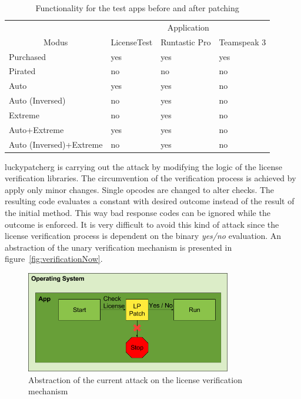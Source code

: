 \begin{table}
\centering
\begin{tabular}{llll}
                                             & \multicolumn{3}{c}{Application}             \\
\multicolumn{1}{c|}{Modus}                   & LicenseTest & Runtastic Pro & Teamspeak 3 \\ \hline
\multicolumn{1}{l|}{Purchased}               & yes           & yes           & yes         \\
\multicolumn{1}{l|}{Pirated}                 & no            & no            & no          \\
\multicolumn{1}{l|}{Auto}                    & yes           & yes           & no          \\
\multicolumn{1}{l|}{Auto (Inversed)}         & no            & yes           & no          \\
\multicolumn{1}{l|}{Extreme}                 & no            & yes           & no          \\
\multicolumn{1}{l|}{Auto+Extreme}            & yes           & yes           & no          \\
\multicolumn{1}{l|}{Auto (Inversed)+Extreme} & no            & yes           & no
\end{tabular}
\caption{Functionality for the test apps before and after patching}
\label{table:functionality}
\end{table}
\gls{luckypatcherg} is carrying out the attack by modifying the logic of the license verification libraries.
The circumvention of the verification process is achieved by apply only minor changes.
Single opcodes are changed to alter checks.
The resulting code evaluates a constant with desired outcome instead of the result of the initial method.
This way bad response codes can be ignored while the outcome is enforced.
It is very difficult to avoid this kind of attack since the license verification process is dependent on the binary \textit{yes/no} evaluation.
An abstraction of the unary verification mechanism is presented in figure~\ref{fig:verificationNow}.
\newline
\begin{figure}[h]
    \centering
    \includegraphics[width=0.8\textwidth]{data/verificationNowAttack.png}
    \caption{Abstraction of the current attack on the license verification mechanism}
    \label{fig:verificationNowAttack}
\end{figure}
